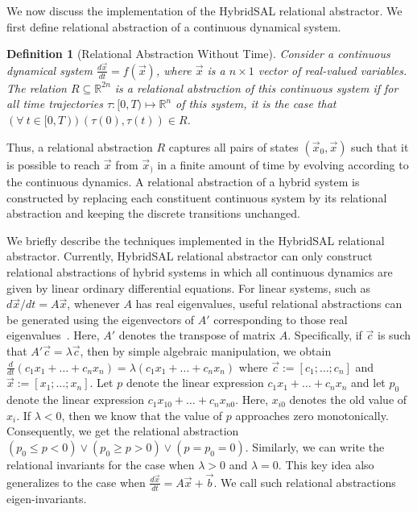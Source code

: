 \documentclass{article}
\newtheorem{definition}{Definition}
\begin{document}
We now discuss the implementation of the HybridSAL relational abstractor.
We first define relational abstraction of a continuous dynamical
system. 

\begin{definition}[Relational Abstraction Without Time]\label{def-ra}
Consider a continuous dynamical system 
$\frac{d\vec{x}}{dt} = f(\vec{x})$, where $\vec{x}$ is a $n\times 1$
vector of real-valued variables.
The relation $R \subseteq \mathbb{R}^{2n}$ is a relational abstraction 
of this continuous system if  for all time
trajectories $\tau: [0,T) \mapsto \mathbb{R}^n$ of this system,
it is the case that
$ (\forall\ t \in [0,T))\ (\tau(0),\tau(t)) \in R$.
\end{definition}
Thus, a relational abstraction $R$
captures all pairs of states $(\vec{x}_0,\vec{x})$ such that it is possible to
reach $\vec{x}$ from $\vec{x}_)$ in a finite amount of time by evolving
according to the continuous dynamics.
A relational abstraction of a hybrid system is constructed by 
replacing each constituent continuous system by its relational 
abstraction and keeping the discrete transitions unchanged.

We briefly describe the techniques implemented in the
HybridSAL relational abstractor.
Currently, HybridSAL relational abstractor can only construct
relational abstractions of hybrid systems in which all
continuous dynamics are given by linear ordinary differential
equations.
For linear systems, such as
$d\vec{x}/dt = A\vec{x}$, whenever $A$ has real eigenvalues, useful
relational abstractions can be generated using the eigenvectors of
${A'}$ corresponding to those real
eigenvalues~\cite{Tiwari03:HSCC}.  Here, ${A'}$ denotes the
transpose of matrix $A$.  Specifically, if $\vec{c}$ is such that
${A'}\vec{c} = \lambda \vec{c}$, then by simple algebraic
manipulation, we obtain $ \frac{d}{dt} (c_1 x_1 + \ldots + c_n x_n) =
\lambda (c_1 x_1 + \ldots + c_n x_n)$ where $\vec{c} :=
[c_1;\ldots;c_n]$ and $\vec{x} := [x_1;\ldots;x_n]$.  Let $p$ denote
the linear expression $c_1 x_1 + \ldots + c_n x_n$ and let $p_0$
denote the linear expression $c_1 x_{10} + \ldots + c_n x_{n0}$.  Here,
$x_{i0}$ denotes the old value of $x_i$.  If $\lambda < 0$, then we
know that the value of $p$ approaches zero monotonically.  Consequently, we
get the relational abstraction 
$ (p_0 \leq p < 0) \vee
  (p_0 \geq p > 0) \vee (p = p_0 = 0) $. Similarly, we can
write the relational invariants for the case when $\lambda > 0$ and
$\lambda = 0$.
This key idea also generalizes to the case when 
$\frac{d\vec{x}}{dt} = A\vec{x}+\vec{b}$.
We call such relational abstractions eigen-invariants.
\end{document}
